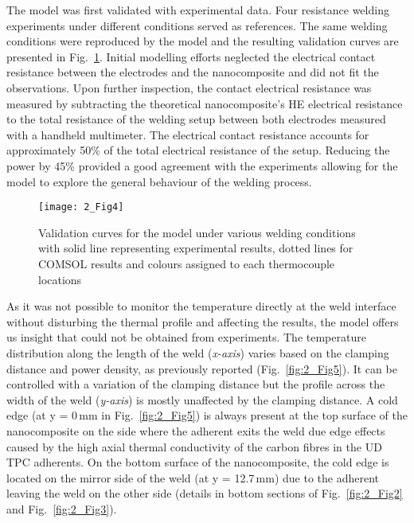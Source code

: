 The model was first validated with experimental data. 
Four resistance welding experiments under different conditions served as references. 
The same welding conditions were reproduced by the model and the resulting validation curves are presented in \mbox{Fig.~\ref{fig:2_Fig4}}. 
Initial modelling efforts neglected the electrical contact resistance between the electrodes and the nanocomposite and did not fit the observations. 
Upon further inspection, the contact electrical resistance was measured by subtracting the theoretical nanocomposite’s HE electrical resistance to the total resistance of the welding setup between both electrodes measured with a handheld multimeter. 
The electrical contact resistance accounts for approximately 50\% of the total electrical resistance of the setup. 
Reducing the power by 45\% provided a good agreement with the experiments allowing for the model to explore the general behaviour of the welding process. 

\begin{figure}[ht]
	\centering
	\texttt{[image: 2\_Fig4]}
	\caption{Validation curves for the model under various welding conditions with solid line representing experimental results, dotted lines for COMSOL results and colours assigned to each thermocouple locations \cite{Brassard2019b}}
	\label{fig:2_Fig4}
\end{figure} 

\FloatBarrier
As it was not possible to monitor the temperature directly at the weld interface without disturbing the thermal profile and affecting the results, the model offers us insight that could not be obtained from experiments. 
The temperature distribution along the length of the weld (\textit{x-axis}) varies based on the clamping distance and power density, as previously reported \cite{Talbot2013} (\mbox{Fig.~\ref{fig:2_Fig5}}). 
It can be controlled with a variation of the clamping distance but the profile across the width of the weld (\textit{y-axis}) is mostly unaffected by the clamping distance. 
A cold edge (at y = \mbox{0\,mm} in \mbox{Fig.~\ref{fig:2_Fig5}}) is always present at the top surface of the nanocomposite on the side where the adherent exits the weld due edge effects caused by the high axial thermal conductivity of the carbon fibres in the UD TPC adherents. 
On the bottom surface of the nanocomposite, the cold edge is located on the mirror side of the weld (at y = \mbox{12.7\,mm}) due to the adherent leaving the weld on the other side (details in bottom sections of \mbox{Fig.~\ref{fig:2_Fig2}} and \mbox{Fig.~\ref{fig:2_Fig3}}). 

